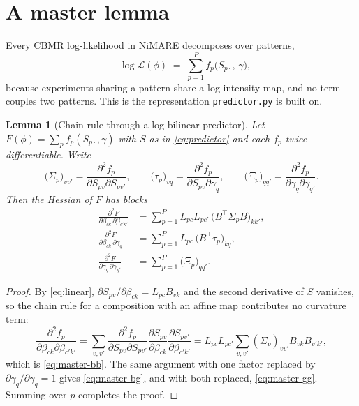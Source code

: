 \documentclass[11pt,a4paper]{article}
\theoremstyle{plain}
\newtheorem{lemma}[proposition]{Lemma}
\theoremstyle{definition}
\begin{document}
\section{A master lemma}

Every CBMR log-likelihood in NiMARE decomposes over patterns,
\begin{equation}\label{eq:decomposition}
  -\log \mathcal{L}(\phi) \;=\; \sum_{p=1}^{P} f_p\bigl(S_{p\cdot},\, \gamma\bigr) ,
\end{equation}
because experiments sharing a pattern share a log-intensity map, and no term couples two
patterns. This is the representation \texttt{predictor.py} is built on.

\begin{lemma}[Chain rule through a log-bilinear predictor]\label{lem:master}
Let $F(\phi) = \sum_p f_p(S_{p\cdot}, \gamma)$ with $S$ as in \eqref{eq:predictor} and each $f_p$
twice differentiable. Write
\[
  \bigl(\Sigma_p\bigr)_{vv'} = \frac{\partial^2 f_p}{\partial S_{pv} \partial S_{pv'}},
  \qquad
  \bigl(\tau_p\bigr)_{vq} = \frac{\partial^2 f_p}{\partial S_{pv} \partial \gamma_q},
  \qquad
  \bigl(\Xi_p\bigr)_{qq'} = \frac{\partial^2 f_p}{\partial \gamma_q \partial \gamma_{q'}} .
\]
Then the Hessian of $F$ has blocks
\begin{align}
  \frac{\partial^2 F}{\partial \beta_{ck}\,\partial \beta_{c'k'}}
    &= \sum_{p=1}^{P} L_{pc} L_{pc'} \, \bigl(B^\top \Sigma_p B\bigr)_{kk'},
      \label{eq:master-bb}\\
  \frac{\partial^2 F}{\partial \beta_{ck}\,\partial \gamma_q}
    &= \sum_{p=1}^{P} L_{pc} \, \bigl(B^\top \tau_p\bigr)_{kq},
      \label{eq:master-bg}\\
  \frac{\partial^2 F}{\partial \gamma_q\,\partial \gamma_{q'}}
    &= \sum_{p=1}^{P} \bigl(\Xi_p\bigr)_{qq'} .
      \label{eq:master-gg}
\end{align}
\end{lemma}

\begin{proof}
By \eqref{eq:linear}, $\partial S_{pv}/\partial\beta_{ck} = L_{pc}B_{vk}$ and the second
derivative of $S$ vanishes, so the chain rule for a composition with an affine map contributes
no curvature term:
\[
  \frac{\partial^2 f_p}{\partial \beta_{ck} \partial \beta_{c'k'}}
  = \sum_{v,v'} \frac{\partial^2 f_p}{\partial S_{pv}\partial S_{pv'}}
      \frac{\partial S_{pv}}{\partial\beta_{ck}} \frac{\partial S_{pv'}}{\partial\beta_{c'k'}}
  = L_{pc}L_{pc'} \sum_{v,v'} (\Sigma_p)_{vv'} B_{vk}B_{v'k'} ,
\]
which is \eqref{eq:master-bb}. The same argument with one factor replaced by
$\partial \gamma_q/\partial\gamma_q = 1$ gives \eqref{eq:master-bg}, and with both replaced,
\eqref{eq:master-gg}. Summing over $p$ completes the proof.
\end{proof}
\end{document}
